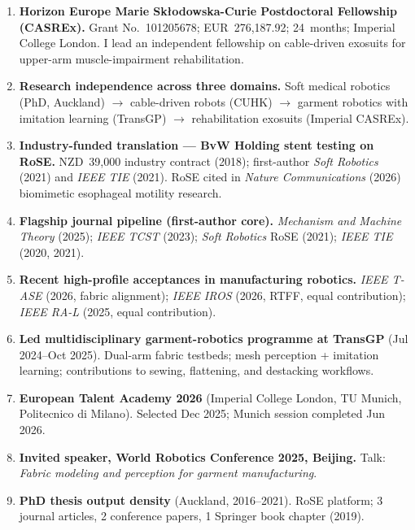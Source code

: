 \documentclass[11pt,a4paper]{article}
\newcommand{\rank}[1]{\textcolor{rankgold}{\textbf{#1}}}
\begin{document}
\begin{enumerate}[leftmargin=1.6em, itemsep=0.55em, label=\rank{\arabic*.}]

  \item \textbf{Horizon Europe Marie Sk\l{}odowska-Curie Postdoctoral Fellowship (CASREx).}
  Grant No.~101205678; EUR~276,187.92; 24~months; Imperial College London.
  I lead an independent fellowship on cable-driven exosuits for upper-arm muscle-impairment rehabilitation.

  \item \textbf{Research independence across three domains.}
  Soft medical robotics (PhD, Auckland) $\to$ cable-driven robots (CUHK) $\to$ garment robotics with imitation learning (TransGP) $\to$ rehabilitation exosuits (Imperial CASREx).

  \item \textbf{Industry-funded translation --- BvW Holding stent testing on RoSE.}
  NZD~39,000 industry contract (2018); first-author \textit{Soft Robotics} (2021) and \textit{IEEE TIE} (2021). RoSE cited in \textit{Nature Communications} (2026) biomimetic esophageal motility research.

  \item \textbf{Flagship journal pipeline (first-author core).}
  \textit{Mechanism and Machine Theory} (2025); \textit{IEEE TCST} (2023); \textit{Soft Robotics} RoSE (2021); \textit{IEEE TIE} (2020, 2021).

  \item \textbf{Recent high-profile acceptances in manufacturing robotics.}
  \textit{IEEE T-ASE} (2026, fabric alignment); \textit{IEEE IROS} (2026, RTFF, equal contribution); \textit{IEEE RA-L} (2025, equal contribution).

  \item \textbf{Led multidisciplinary garment-robotics programme at TransGP} (Jul 2024--Oct 2025).
  Dual-arm fabric testbeds; mesh perception + imitation learning; contributions to sewing, flattening, and destacking workflows.

  \item \textbf{European Talent Academy 2026} (Imperial College London, TU Munich, Politecnico di Milano).
  Selected Dec 2025; Munich session completed Jun 2026.

  \item \textbf{Invited speaker, World Robotics Conference 2025, Beijing.}
  Talk: \textit{Fabric modeling and perception for garment manufacturing}.

  \item \textbf{PhD thesis output density} (Auckland, 2016--2021).
  RoSE platform; 3 journal articles, 2 conference papers, 1 Springer book chapter (2019).


\end{enumerate}
\end{document}
